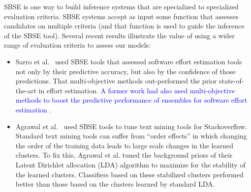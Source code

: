 \documentclass[sigconf,anonymous,review]{acmart}
\newcommand\llm[1]{\textcolor{blue}{#1\xspace}}
\begin{document}
SBSE is one way to build inference systems that are specialized to specialized evaluation
criteria. SBSE systems accept as input some function that assesses candidates on multiple
criteria (and that function is used to   guide the inference of the SBSE tool).
Several recent results illustrate the value of using a wider range of evaluation criteria
to assess our models:
\begin{itemize}
\item
Sarro et al.~\cite{sarro2016multi}  used SBSE tools that assessed software effort estimation tools
not only by their predictive accuracy, but also by the confidence of those predictions.
That multi-objective methods out-performed the prior state-of-the-art in effort estimation. 
\llm{A former work had also used multi-objective methods to boost the predictive performance of ensembles for
software effort estimation \cite{minku2013}.}
\item
Agrawal et al.~\cite{agrawalwrong} used SBSE tools to tune text mining tools for Stackoverflow.
Standard text mining tools can suffer from ``order effects'' in which changing the order
of the training data leads to large scale changes in the learned clusters.
To fix this, Agrawal et al. tuned the background priors
of their Latent Dirichlet allocation (LDA) algorithm to maximize for the stability
of the learned clusters.  Classifiers based on these stabilized clusters performed better than those based on the clusters learned by standard LDA.
\end{itemize}



\end{document}
